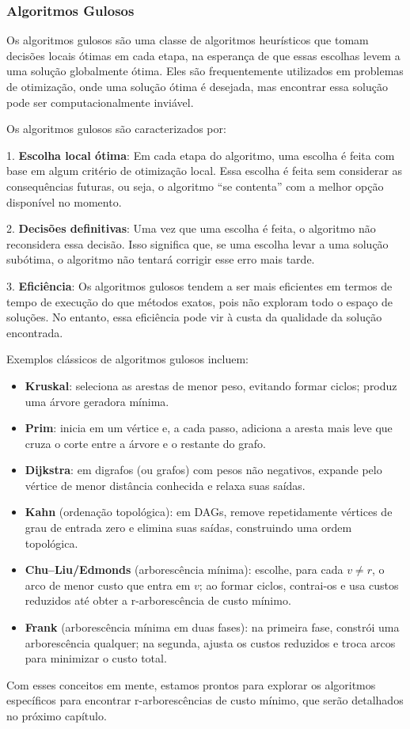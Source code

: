 \subsubsection{Algoritmos Gulosos}

Os algoritmos gulosos são uma classe de algoritmos heurísticos que tomam decisões locais ótimas em cada etapa, na esperança de que essas escolhas levem a uma solução globalmente ótima. Eles são frequentemente utilizados em problemas de otimização, onde uma solução ótima é desejada, mas encontrar essa solução pode ser computacionalmente inviável.


Os algoritmos gulosos são caracterizados por:


1. \textbf{Escolha local ótima}: Em cada etapa do algoritmo, uma escolha é feita com base em algum critério de otimização local. Essa escolha é feita sem considerar as consequências futuras, ou seja, o algoritmo ``se contenta'' com a melhor opção disponível no momento.


2. \textbf{Decisões definitivas}: Uma vez que uma escolha é feita, o algoritmo não reconsidera essa decisão. Isso significa que, se uma escolha levar a uma solução subótima, o algoritmo não tentará corrigir esse erro mais tarde.


3. \textbf{Eficiência}: Os algoritmos gulosos tendem a ser mais eficientes em termos de tempo de execução do que métodos exatos, pois não exploram todo o espaço de soluções. No entanto, essa eficiência pode vir à custa da qualidade da solução encontrada.


Exemplos clássicos de algoritmos gulosos incluem:

\begin{itemize}
	\item \textbf{Kruskal}: seleciona as arestas de menor peso, evitando formar ciclos; produz uma árvore geradora mínima.
	\item \textbf{Prim}: inicia em um vértice e, a cada passo, adiciona a aresta mais leve que cruza o corte entre a árvore e o restante do grafo.
	\item \textbf{Dijkstra}: em digrafos (ou grafos) com pesos não negativos, expande pelo vértice de menor distância conhecida e relaxa suas saídas.
	\item  \textbf{Kahn} (ordenação topológica): em DAGs, remove repetidamente vértices de grau de entrada zero e elimina suas saídas, construindo uma ordem topológica.
	\item \textbf{Chu–Liu/Edmonds} (arborescência mínima): escolhe, para cada \(v\neq r\), o arco de menor custo que entra em \(v\); ao formar ciclos, contrai-os e usa custos reduzidos até obter a r-arborescência de custo mínimo.
	\item \textbf{Frank} (arborescência mínima em duas fases): na primeira fase, constrói uma arborescência qualquer; na segunda, ajusta os custos reduzidos e troca arcos para minimizar o custo total.
\end{itemize}


Com esses conceitos em mente, estamos prontos para explorar os algoritmos específicos para encontrar r-arborescências de custo mínimo, que serão detalhados no próximo capítulo.
